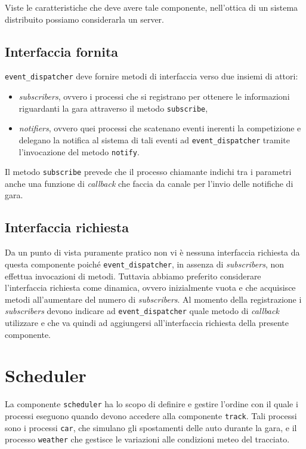 \documentclass[a4paper]{report}
\newcommand{\fun}[1]{\texttt{#1}}
\begin{document}
Viste le caratteristiche che deve avere tale componente, nell'ottica di un sistema distribuito possiamo considerarla un server.

\subsection*{Interfaccia fornita}
\texttt{event\_dispatcher} deve fornire metodi di interfaccia verso due insiemi di attori:
\begin{itemize}
\item \textit{subscribers}, ovvero i processi che si registrano per ottenere le informazioni riguardanti la gara attraverso il metodo \fun{subscribe},
\item \textit{notifiers}, ovvero quei processi che scatenano eventi inerenti la competizione e delegano la notifica al sistema di tali eventi ad \texttt{event\_dispatcher} tramite l'invocazione del metodo \fun{notify}.
\end{itemize}
Il metodo \fun{subscribe} prevede che il processo chiamante indichi tra i parametri anche una funzione di \textit{callback} che faccia da canale per l'invio delle notifiche di gara.

\subsection*{Interfaccia richiesta}
Da un punto di vista puramente pratico non vi è nessuna interfaccia richiesta da questa componente poiché \texttt{event\_dispatcher}, in assenza di \textit{subscribers}, non effettua invocazioni di metodi. Tuttavia abbiamo preferito considerare l'interfaccia richiesta come dinamica, ovvero inizialmente vuota e che acquisisce metodi all'aumentare del numero di \textit{subscribers}. Al momento della registrazione i \textit{subscribers} devono indicare ad \texttt{event\_dispatcher} quale metodo di \textit{callback} utilizzare e che va quindi ad aggiungersi all'interfaccia richiesta della presente componente.


\section{Scheduler}
La componente \texttt{scheduler} ha lo scopo di definire e gestire l'ordine con il quale i processi eseguono quando devono accedere alla componente \texttt{track}.
Tali processi sono i processi \texttt{car}, che simulano gli spostamenti delle auto durante la gara, e il processo \texttt{weather} che gestisce le variazioni alle condizioni meteo del tracciato.
\end{document}
